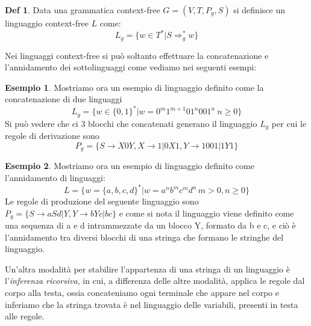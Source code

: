 \documentclass[a4paper]{book}
\theoremstyle{definition}%
\newtheorem*{defi}{Def}%
\newtheorem*{esempio}{Esempio}
\begin{document}
  \begin{defi}
    Data una grammatica context-free $G = (V, T, P_g, S)$ si definisce un linguaggio context-free $L$ come:
    \begin{equation*}
      L_g = \{ w \in T^* | S \Rightarrow _g ^* w \}
    \end{equation*}
  \end{defi}

  Nei linguaggi context-free si può soltanto effettuare la concatenazione e l'annidamento dei sottolinguaggi come vediamo
  nei seguenti esempi:

  \begin{esempio}
  Mostriamo ora un esempio di linguaggio definito come la concatenazione di due linguaggi
  \begin{equation*}
     L_g = \{ w \in \{0,1\}^* | w = 0^m 1^{m+1}01^n001^n \ n\geq 0\}
  \end{equation*}
  Si può vedere che ci 3 blocchi che concatenati generano il linguaggio $L_g$ per cui le regole di derivazione sono
  \[ P_g = \{S \to X0Y, X \to 1 | 0X1, Y \to 1001 | 1Y1\} \]
  \end{esempio}
  \begin{esempio}
    Mostriamo ora un esempio di linguaggio definito come l'annidamento di linguaggi:
    \begin{equation*}
      L = \{ w = \{a,b,c,d\}^* | w = a^nb^mc^md^n \, m > 0, n \geq 0\}
    \end{equation*}
    Le regole di produzione del seguente linguaggio sono $P_g = \{S \to aSd | Y, Y \to bYc | bc\}$
    e come si nota il linguaggio viene definito come una sequenza di a e d intrammezzate da un blocco Y, formato da b e c,
    e ciò è l'annidamento tra diversi blocchi di una stringa che formano le stringhe del linguaggio.
  \end{esempio}

  Un'altra modalità per stabilire l'appartenza di una stringa di un linguaggio è l'\emph{inferenza ricorsiva}, in cui, a differenza delle altre
  modalità, applica le regole dal corpo alla testa, ossia concateniamo ogni terminale che appare nel corpo e inferiamo che la stringa trovata
  è nel linguaggio delle variabili, presenti in testa alle regole.
\end{document}
